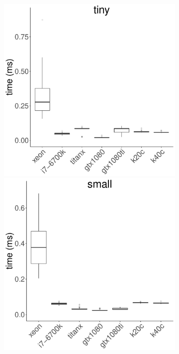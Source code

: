 \documentclass[../document.tex]{subfiles}
\begin{document}
\begin{figure}
	\begin{subfigure}{0.09\textwidth} \label{fig:time-csr} \vspace{5mm}\end{subfigure}
	\begin{subfigure}{0.9\textwidth}
		\includegraphics[width=\plotwidth]{figures/time-results/generate_csr_tiny_boxplot-1}
		\includegraphics[width=\plotwidth]{figures/time-results/generate_csr_small_boxplot-1}

\end{subfigure}
\end{figure}
\end{document}
